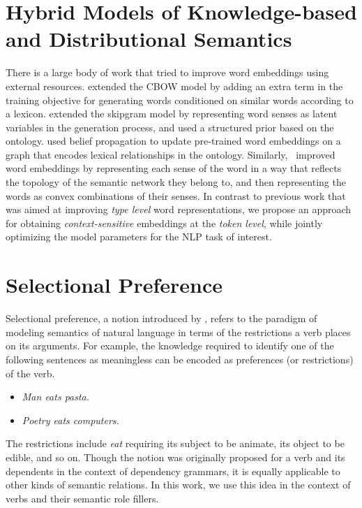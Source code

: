 \section{Hybrid Models of Knowledge-based and Distributional Semantics}
There is a large body of work that tried to improve word embeddings using external resources. \cite{yu:14} extended the CBOW model \citep{mikolov:13} by adding an extra term in the training objective for generating words conditioned on similar words according to a lexicon.
\cite{jauhar:15} extended the skipgram model \citep{mikolov:13} by representing word senses as latent variables in the generation process, and used a structured prior based on the ontology.
\cite{faruqui:15} used belief propagation to update pre-trained word embeddings on a graph that encodes lexical relationships in the ontology.
Similarly,~\cite{johansson2015embedding} improved word embeddings by representing each sense of the word in a way that reflects the topology of the semantic network they belong to, and then representing the words as convex combinations of their senses.
In contrast to previous work that was aimed at improving \textit{type level} word representations, we propose an approach for obtaining \textit{context-sensitive} embeddings at the \textit{token level}, while jointly optimizing the model parameters for the NLP task of interest.

\section{Selectional Preference}
Selectional preference, a notion introduced by \cite{wilks1973preference}, 
refers to the paradigm of modeling semantics of
natural language in terms of the restrictions a verb places on its arguments. 
For example, the knowledge required to identify
one of the following sentences as meaningless can be encoded as preferences (or 
restrictions) of the verb.
\begin{itemize}
 \item[] \textit{Man eats pasta.}
 \item[] \textit{Poetry eats computers.}
\end{itemize}
The restrictions include \textit{eat} requiring its subject to be animate, its 
object to be edible, and so on. Though the
notion was originally proposed for a verb and its dependents in the context of 
dependency grammars, it is equally applicable to
other kinds of semantic relations. In this work,
we use this idea in the context of verbs and their semantic role fillers.

